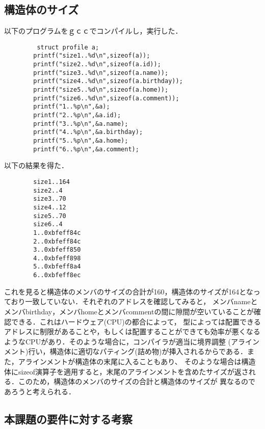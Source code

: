 \documentclass[a4paper,11pt]{jarticle}
\begin{document}
\subsection{構造体のサイズ}
以下のプログラムをｇｃｃでコンパイルし，実行した．

{\fontsize{10pt}{11pt} \selectfont
 \begin{verbatim}
         struct profile a;
        printf("size1..%d\n",sizeof(a));
        printf("size2..%d\n",sizeof(a.id));
        printf("size3..%d\n",sizeof(a.name));
        printf("size4..%d\n",sizeof(a.birthday));
        printf("size5..%d\n",sizeof(a.home));
        printf("size6..%d\n",sizeof(a.comment));
        printf("1..%p\n",&a);
        printf("2..%p\n",&a.id);
        printf("3..%p\n",&a.name);
        printf("4..%p\n",&a.birthday);
        printf("5..%p\n",&a.home);
        printf("6..%p\n",&a.comment);
 \end{verbatim}
}
\noindent
以下の結果を得た．

{\fontsize{10pt}{11pt} \selectfont
 \begin{verbatim}
        size1..164
        size2..4
        size3..70
        size4..12
        size5..70
        size6..4
        1..0xbfeff84c
        2..0xbfeff84c
        3..0xbfeff850
        4..0xbfeff898
        5..0xbfeff8a4
        6..0xbfeff8ec
 \end{verbatim}
}

これを見ると構造体のメンバのサイズの合計が160，構造体のサイズが164となっており一致していない．それぞれのアドレスを確認してみると，
メンバnameとメンバbirthday，メンバhomeとメンバcommentの間に隙間が空いていることが確認できる．これはハードウェア(CPU)の都合によって，
型によっては配置できるアドレスに制限があることや，もしくは配置することができても効率が悪くなるようなCPUがあり．そのような場合に，コンパイラが適当に境界調整
(アラインメント)行い，構造体に適切なパティング(詰め物)が挿入されるからである．また，アラインメントが構造体の末尾に入ることもあり、
そのような場合は構造体にsizeof演算子を適用すると，末尾のアラインメントを含めたサイズが返される．このため，構造体のメンバのサイズの合計と構造体のサイズが
異なるのであろうと考えられる．

\subsection{本課題の要件に対する考察}
\end{document}
